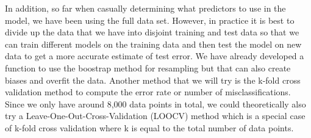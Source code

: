 \documentclass{article}
\begin{document}
In addition, so far when casually determining what predictors to use in the model, we have been using the full data set.  However, in practice it is best to divide up the data that we have into disjoint training and test data so that we can train different models on the training data and then test the model on new data to get a more accurate estimate of test error.  We have already developed a function to use the boostrap method for resampling but that can also create biases and overfit the data.  Another method that we will try is the k-fold cross validation method to compute the error rate or number of misclassifications.  Since we only have around 8,000 data points in total, we could theoretically also try a Leave-One-Out-Cross-Validation (LOOCV) method which is a special case of k-fold cross validation where k is equal to the total number of data points.\\
\end{document}
